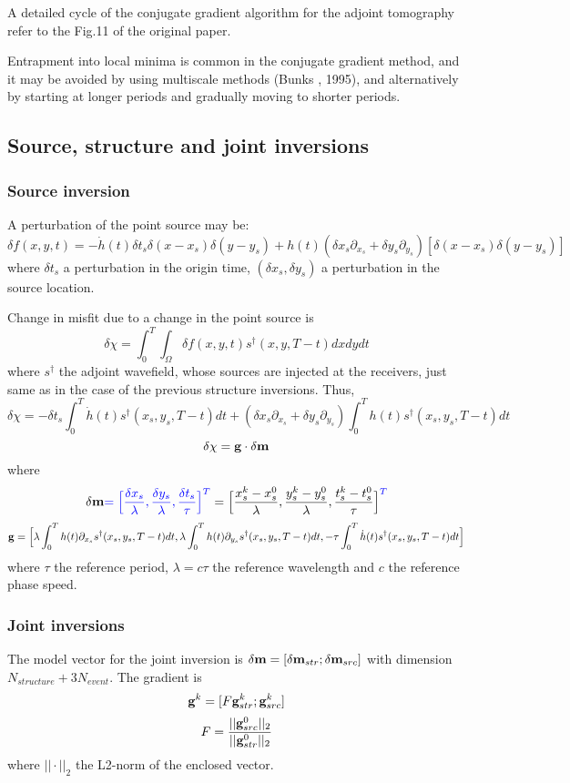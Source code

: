 A detailed cycle of the conjugate gradient algorithm for the adjoint tomography refer to the Fig.11 of the original paper.\par
Entrapment into local minima is common in the conjugate gradient method, and it may be avoided by using multiscale methods (Bunks \etal, 1995), and alternatively by starting at longer periods and gradually moving to shorter periods.\par
\subsection{Source, structure and joint inversions}
\subsubsection{Source inversion}
A perturbation of the point source may be:
\[ \delta f(x,y,t)=-\dot h(t)\delta t_s\delta(x-x_s)\delta(y-y_s)+h(t)(\delta x_s\partial_{x_s}+\delta y_s\partial_{y_s})[\delta(x-x_s)\delta(y-y_s)] \]
where $\delta t_s$ a perturbation in the origin time, $(\delta x_s,\delta y_s)$ a perturbation in the source location.\par
Change in misfit due to a change in the point source is
\[ \delta\chi=\int_0^T\int_\Omega\delta f(x,y,t)s^\dagger(x,y,T-t)dxdydt \]
where $s^\dagger$ the adjoint wavefield, whose sources are injected at the receivers, just same as in the case of the previous structure inversions. Thus,
\[ \delta\chi=-\delta t_s\int_0^T\dot h(t)s^\dagger(x_s,y_s,T-t)dt+(\delta x_s\partial_{x_s}+\delta y_s\partial_{y_s})\int_0^Th(t)s^\dagger(x_s,y_s,T-t)dt \]
\[ \delta\chi=\mathbf{g}\cdot\delta\mathbf{m} \]
where
\[ \delta\mathbf{m}{\color{blue}=\Big[\frac{\delta x_s}{\lambda},\frac{\delta y_s}{\lambda},\frac{\delta t_s}{\tau}\Big]^T}=\Big[\frac{x_s^k-x_s^0}{\lambda},\frac{y_s^k-y_s^0}{\lambda},\frac{t_s^k-t_s^0}{\tau}\Big]^{\color{blue}T} \]
\[ \mathbf{g}=\Big[\lambda\int_0^Th(t)\partial_{x_s}s^\dagger(x_s,y_s,T-t)dt,\lambda\int_0^Th(t)\partial_{y_s}s^\dagger(x_s,y_s,T-t)dt,-\tau\int_0^T\dot h(t)s^\dagger(x_s,y_s,T-t)dt\Big] \]
where $\tau$ the reference period, $\lambda=c\tau$ the reference wavelength and $c$ the reference phase speed.\par
\subsubsection{Joint inversions}
The model vector for the joint inversion is $\delta\mathbf{m}=[\delta\mathbf{m}_{str};\delta\mathbf{m}_{src}]$ with dimension $N_{structure}+3N_{event}$. The gradient is
\[ \mathbf{g}^k=[F\mathbf{g}_{str}^k;\mathbf{g}_{src}^k] \]
\[ F=\frac{||\mathbf{g}_{src}^0||_2}{||\mathbf{g}_{str}^0||_2} \]
where $||\cdot||_2$ the L2-norm of the enclosed vector.\par
